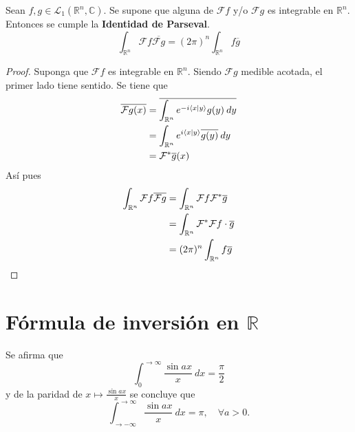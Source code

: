 \documentclass[12pt]{report}
\newcounter{it}
\theoremstyle{largebreak}
\newcommand\pint[2]{\ensuremath{\langle#1| #2\rangle}}
\newcommand\conj[1]{\ensuremath{\overline{#1}}}
\newcommand{\fou}[1]{\ensuremath{\mathcal{F}#1}}
\begin{document}
    \begin{propo}
        Sean $f,g\in\mathcal{L}_1(\mathbb{R}^n,\mathbb{C})$. Se supone que alguna de $\fou{f}$ y/o $\fou{g}$ es integrable en $\mathbb{R}^n$. Entonces se cumple la \textbf{Identidad de Parseval}.
        \begin{equation*}
            \int_{\mathbb{R}^n}\fou{f}\conj{\fou{g}}=(2\pi)^n\int_{\mathbb{R}^n}f\conj{g}
        \end{equation*}
    \end{propo}

    \begin{proof}
        Suponga que $\fou{f}$ es integrable en $\mathbb{R}^n$. Siendo $\fou{g}$ medible acotada, el primer lado tiene sentido. Se tiene que
        \begin{equation*}
            \begin{split}
                \conj{\fou{g}(x)}&=\conj{\int_{\mathbb{R}^n}e^{ -i\pint{x}{y}}g(y)\:dy}\\
                &=\int_{\mathbb{R}^n}e^{i\pint{x}{y}}\conj{g(y)}\:dy\\
                &=\fou^*{\conj{g}}(x)\\
            \end{split}
        \end{equation*}
        Así pues
        \begin{equation*}
            \begin{split}
                \int_{\mathbb{R}^n}\fou{f}\conj{\fou{g}}&=\int_{\mathbb{R}^n}\fou{f}\fou^*{\conj{g}}\\
                &=\int_{\mathbb{R}^n}\fou^*{\fou{f}}\cdot\conj{g}\\
                &=(2\pi)^n\int_{\mathbb{R}^n}f\conj{g}\\
            \end{split}
        \end{equation*}
    \end{proof}

    \section{Fórmula de inversión en $\mathbb{R}$}

    \begin{obs}
        Se afirma que
        \begin{equation*}
            \int_{0}^{\rightarrow\infty}\frac{\sin ax}{x}\:dx=\frac{\pi}{2}
        \end{equation*}
        y de la paridad de $x\mapsto\frac{\sin ax}{x}$ se concluye que
        \begin{equation*}
            \int_{ \rightarrow-\infty}^{\rightarrow\infty}\frac{\sin ax}{x}\:dx=\pi,\quad\forall a>0.
        \end{equation*}
    \end{obs}
\end{document}

